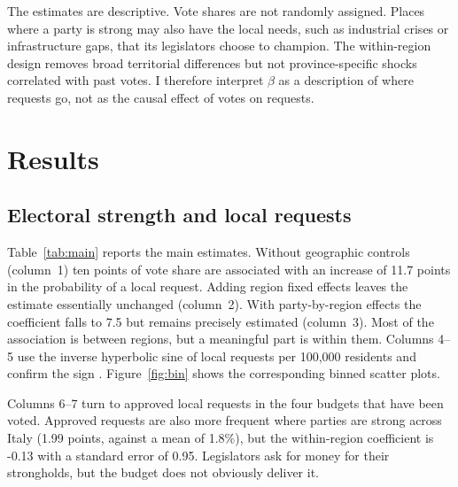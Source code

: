 \documentclass[12pt]{article}
\begin{document}
The estimates are descriptive. Vote shares are not randomly assigned. Places where a party is strong may also have the local needs, such as industrial crises or infrastructure gaps, that its legislators choose to champion. The within-region design removes broad territorial differences but not province-specific shocks correlated with past votes. I therefore interpret $\beta$ as a description of where requests go, not as the causal effect of votes on requests.

\section{Results}\label{sec:results}

\subsection{Electoral strength and local requests}

Table~\ref{tab:main} reports the main estimates. Without geographic controls (column~1) ten points of vote share are associated with an increase of 11.7 points in the probability of a local request. Adding region fixed effects leaves the estimate essentially unchanged (column~2). With party-by-region effects the coefficient falls to 7.5 but remains precisely estimated (column~3). Most of the association is between regions, but a meaningful part is within them. Columns 4--5 use the inverse hyperbolic sine of local requests per 100,000 residents and confirm the sign \citep{bellemare2020}. Figure~\ref{fig:bin} shows the corresponding binned scatter plots.

Columns 6--7 turn to approved local requests in the four budgets that have been voted. Approved requests are also more frequent where parties are strong across Italy (1.99 points, against a mean of 1.8\%), but the within-region coefficient is -0.13 with a standard error of 0.95. Legislators ask for money for their strongholds, but the budget does not obviously deliver it.
\end{document}
